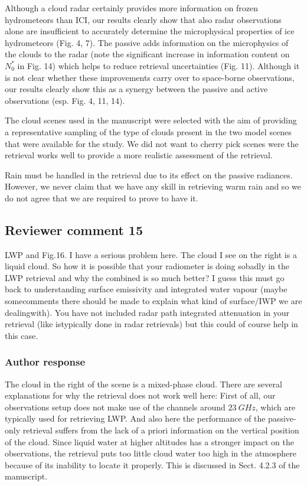 Although a cloud radar certainly provides more information on frozen
hydrometeors than ICI, our results clearly show that also radar observations
alone are insufficient to accurately determine the microphysical properties of
ice hydrometeors (Fig. 4, 7). The passive adds information on the microphysics
of the clouds to the radar (note the significant increase in information content
on $N_0^*$ in Fig. 14) which helps to reduce retrieval uncertainties (Fig. 11).
Although it is not clear whether these improvements carry over to space-borne
observations, our results clearly show this as a synergy between the passive and
active observations (esp. Fig. 4, 11, 14).

The cloud scenes used in the manuscript were selected with the aim of providing
a representative sampling of the type of clouds present in the two model scenes that
were available for the study. We did not want to cherry pick scenes were the
retrieval works well to provide a more realistic assessment of  the retrieval.

Rain must be handled in the retrieval due to its effect on the passive
radiances. However, we never claim that we have any skill in retrieving warm
rain and so we do not agree that we are required to prove to have it.

\subsection*{Reviewer comment 15}

 LWP and Fig.16. I have a serious problem here. The cloud I see on the right is a
 liquid cloud. So how it is possible that your radiometer is doing sobadly in
 the LWP retrieval and why the combined is so much better? I guess this must go
 back to understanding surface emissivity and integrated water vapour (maybe
 somecomments there should be made to explain what kind of surface/IWP we are
 dealingwith). You have not included radar path integrated attenuation in your
 retrieval (like istypically done in radar retrievals) but this could of course
 help in this case.

\subsubsection*{Author response}

The cloud in the right of the scene is a mixed-phase cloud. There are several
explanations for why the retrieval does not work well here: First of all, our
observations setup does not make use of the channels around $23\ \unit{GHz}$,
which are typically used for retrieving LWP. And also here the performance of
the passive-only retrieval suffers from the lack of a priori information on the
vertical position of the cloud. Since liquid water at higher altitudes has a
stronger impact on the observations, the retrieval puts too little cloud water
too high in the atmosphere because of its inability to locate it properly. This
is discussed in Sect. 4.2.3 of the manuscript.


